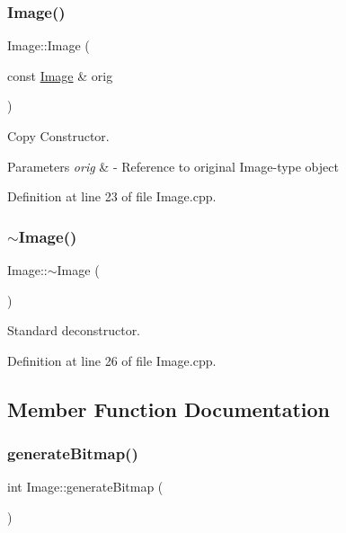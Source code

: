 \subsubsection{\texorpdfstring{Image()}{Image()}\hspace{0.1cm}{\footnotesize\ttfamily [3/3]}}
{\footnotesize\ttfamily Image\+::\+Image (\begin{DoxyParamCaption}\item[{const \mbox{\hyperlink{classImage}{Image}} \&}]{orig }\end{DoxyParamCaption})}



Copy Constructor. 


\begin{DoxyParams}{Parameters}
{\em orig} & -\/ Reference to original Image-\/type object \\
\hline
\end{DoxyParams}


Definition at line 23 of file Image.\+cpp.

\mbox{\label{classImage_a0294f63700543e11c0f0da85601c7ae5}} 
\subsubsection{\texorpdfstring{$\sim$Image()}{~Image()}}
{\footnotesize\ttfamily Image\+::$\sim$\+Image (\begin{DoxyParamCaption}{ }\end{DoxyParamCaption})\hspace{0.3cm}{\ttfamily [virtual]}}

Standard deconstructor. 

Definition at line 26 of file Image.\+cpp.



\subsection{Member Function Documentation}
\mbox{\label{classImage_a3ca1ae6c1eb2846bfba066b01e6020e1}} 
\subsubsection{\texorpdfstring{generateBitmap()}{generateBitmap()}}
{\footnotesize\ttfamily int Image\+::generate\+Bitmap (\begin{DoxyParamCaption}{ }\end{DoxyParamCaption})}



